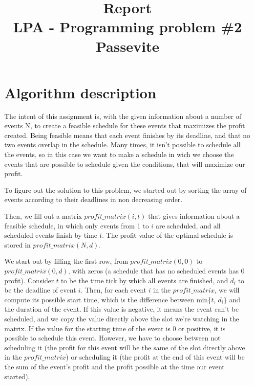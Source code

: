 \documentclass{article}
\title{%
  Report \\
  LPA - Programming problem \#2 \\
  \large Passevite}
\date{\vspace{-5ex}}
\begin{document}
\maketitle


\section{Algorithm description}

\qquad The intent of this assignment is, with the given information about a number of events N, to create a feasible schedule for these events that maximizes the profit created. Being feasible means that each event finishes by its deadline, and that no two events overlap in the schedule. Many times, it isn't possible to schedule all the events, so in this case we want to make a schedule in wich we choose the events that are possible to schedule given the conditions, that will maximize our profit.

To figure out the solution to this problem, we started out by sorting the array of events according to their deadlines in non decreasing order.

Then, we fill out a matrix $profit\_matrix(i, t)$ that gives information about a feasible schedule, in which only events from 1 to $i$ are scheduled, and all scheduled events finish by time $t$. The profit value of the optimal schedule is stored in $profit\_matrix(N, d)$.

We start out by filling the first row, from $profit\_matrix(0, 0)$ to $profit\_matrix(0, d)$, with zeros (a schedule that has no scheduled events has 0 profit). Consider $t$ to be the time tick by which all events are finished, and $d_i$ to be the deadline of event $i$. Then, for each event $i$ in the $profit\_matrix$, we will compute its possible start time, which is the difference between min\{$t$, $d_i$\} and the duration of the event. If this value is negative, it means the event can't be scheduled, and we copy the value directly above the slot we're watching in the matrix. If the value for the starting time of the event is 0 or positive, it is possible to schedule this event. However, we have to choose between not scheduling it (the profit for this event will be the same of the slot directly above in the $profit\_matrix$) or scheduling it (the profit at the end of this event will be the sum of the event's profit and the profit possible at the time our event started).
\end{document}
